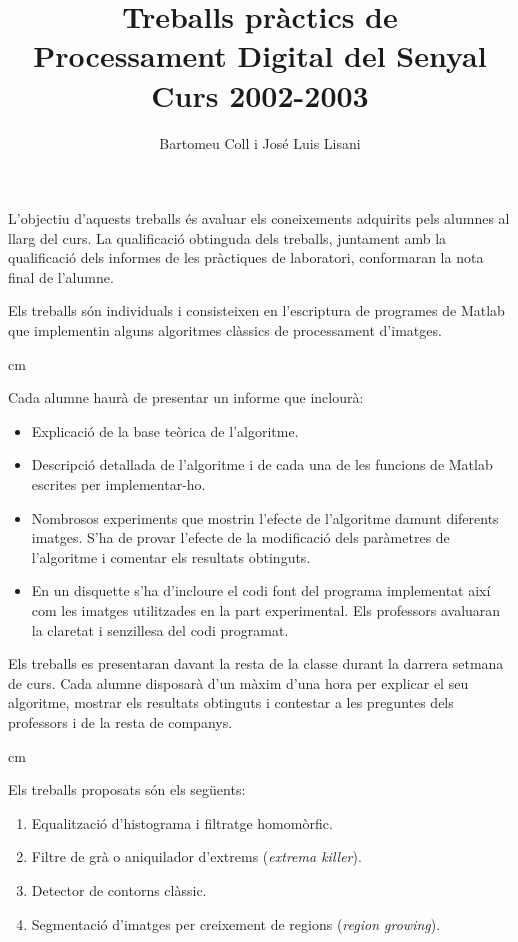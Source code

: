 \documentclass{article}
\title{Treballs pr\`actics de\\ Processament Digital del Senyal\\Curs 2002-2003}
\date{}
\author{Bartomeu Coll i Jos\'e Luis Lisani}
\begin{document}
\maketitle

L'objectiu d'aquests treballs \'es avaluar els coneixements 
adquirits pels alumnes al llarg del curs. La qua\-li\-fi\-ca\-ci\'o obtinguda
dels treballs, juntament amb la qua\-li\-fi\-ca\-ci\'o dels informes de les
pr\`actiques de laboratori, conformaran la nota final de l'alumne.

Els treballs s\'on individuals i consisteixen en l'escriptura de 
programes de Matlab que implementin alguns algoritmes cl\`assics de 
processament d'imatges. 

 cm

Cada alumne haur\`a de presentar un informe que inclour\`a:
\begin{itemize}
\item Explicaci\'o de la base te\`orica de l'algoritme.  
\item Descripci\'o detallada de l'algoritme i de cada una de les funcions
de Matlab escrites per implementar-ho.
\item Nombrosos experiments que mostrin l'efecte de l'algoritme damunt
di\-fe\-rents imatges. S'ha de provar l'efecte de la modificaci\'o dels par\`ametres de
l'algoritme i comentar els resultats obtinguts.
\item En un disquette s'ha d'incloure el codi font del programa implementat aix\'i 
com les imatges utilitzades en la part experimental. Els professors avaluaran la
claretat i senzillesa del codi programat.
\end{itemize}

Els treballs es presentaran davant la resta de la classe durant la darrera 
setmana de curs. Cada alumne disposar\`a d'un m\`axim d'una hora per 
explicar el seu algoritme, mostrar els resultats obtinguts i contestar a les
preguntes dels professors i de la resta de companys. 

 cm

Els treballs proposats s\'on els seg\"uents:
\begin{enumerate}
\item Equalitzaci\'o d'histograma i filtratge homom\`orfic.
\item Filtre de gr\`a o aniquilador d'extrems ({\it extrema killer}).
\item Detector de contorns cl\`assic.
\item Segmentaci\'o d'imatges per creixement de regions ({\it region growing}).
\end{enumerate}
\end{document}
